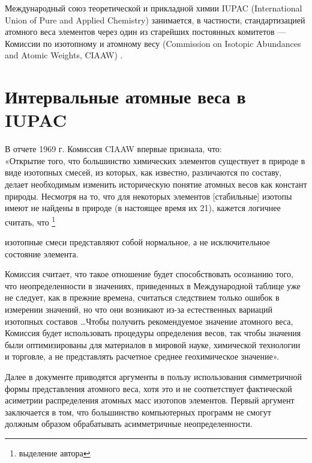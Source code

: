 \documentclass[a5paper,openany]{book}
\begin{document}
Международный союз теоретической 
и прикладной химии IUPAC (International Union of Pure and Applied Chemistry) занимается, в частности, 
стандартизацией атомного веса элементов через один из старейших постоянных комитетов — Комиссии по изотопному и атомному весу (Commission on Isotopic Abundances and Atomic Weights, CIAAW) \cite{CIAAW}.


\section{Интервальные атомные веса в IUPAC}



В отчете 1969 г. \cite{AtomicWeights1969} Комиссия CIAAW впервые признала, что:\\
«Открытие того, что большинство химических элементов существует в природе в виде изотопных смесей,
из которых, как известно, различаются по составу, делает необходимым изменить историческую
понятие атомных весов как констант природы. Несмотря на то, что для некоторых элементов  [стабильные] изотопы имеют не найдены в природе (в настоящее время их 21), кажется логичнее считать, что \footnote{выделение автора}
\begin{center}
	изотопные смеси представляют собой нормальное, а не
	исключительное состояние элемента. 
\end{center} 

Комиссия считает, что такое отношение будет
способствовать осознанию того, что неопределенности в значениях, приведенных в Международной таблице
уже не следует, как в прежние времена, считаться следствием только ошибок в
измерении значений, но что они возникают из-за естественных вариаций изотопных
составов \ldots Чтобы получить рекомендуемое значение атомного веса,
Комиссия будет использовать процедуры определения весов, так чтобы значения были оптимизированы для
материалов в мировой науке, химической технологии и торговле, а не представлять расчетное среднее геохимическое значение».

Далее в документе \cite{AtomicWeights1969} приводятся аргументы в пользу использования симметричной формы представления атомного веса, хотя это и не соответствует фактической асиметрии распределения атомных масс изотопов элементов. Первый аргумент заключается в том, что большинство
компьютерных программ не смогут должным образом обрабатывать асимметричные неопределенности.
\end{document}
